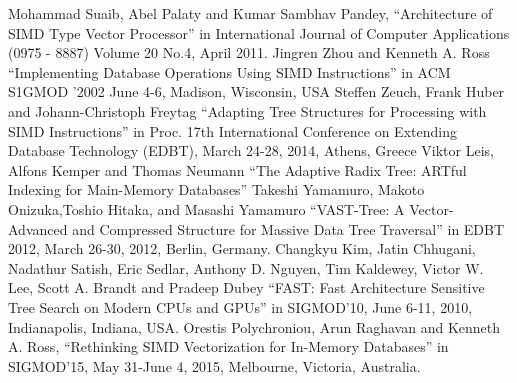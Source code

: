 \documentclass[conference]{IEEEtran}
\begin{document}
\begin{thebibliography}{00}
Mohammad Suaib, Abel Palaty and Kumar Sambhav Pandey, ``Architecture of SIMD Type Vector Processor'' in International Journal of Computer Applications (0975 - 8887) Volume 20 No.4, April 2011.
 Jingren Zhou and Kenneth A. Ross  ``Implementing Database Operations Using SIMD Instructions'' in ACM S1GMOD '2002 June 4-6, Madison, Wisconsin, USA
 Steffen Zeuch, Frank Huber and Johann-Christoph Freytag  ``Adapting Tree Structures for Processing with SIMD Instructions'' in Proc. 17th International Conference on Extending Database Technology (EDBT), March 24-28, 2014, Athens, Greece
 Viktor Leis, Alfons Kemper and Thomas Neumann ``The Adaptive Radix Tree: ARTful Indexing for Main-Memory Databases''
 Takeshi Yamamuro, Makoto Onizuka,Toshio Hitaka, and Masashi Yamamuro ``VAST-Tree: A Vector-Advanced and Compressed Structure for Massive Data Tree Traversal'' in EDBT 2012, March 26-30, 2012, Berlin, Germany.
 Changkyu Kim, Jatin Chhugani, Nadathur Satish, Eric Sedlar, Anthony D. Nguyen,
Tim Kaldewey, Victor W. Lee, Scott A. Brandt and Pradeep Dubey ``FAST: Fast Architecture Sensitive Tree Search
on Modern CPUs and GPUs'' in SIGMOD’10, June 6-11, 2010, Indianapolis, Indiana, USA.
Orestis Polychroniou, Arun Raghavan and Kenneth A. Ross, ``Rethinking SIMD Vectorization for In-Memory Databases'' in SIGMOD’15, May 31-June 4, 2015, Melbourne, Victoria, Australia.
\end{thebibliography}
\end{document}
